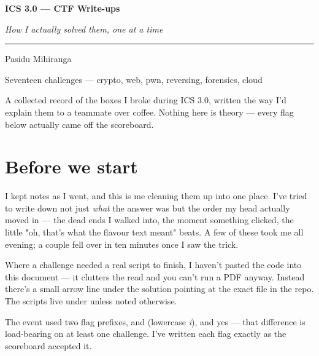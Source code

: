 \documentclass[11pt,a4paper]{article}
\newcommand{\code}[1]{\texttt{\detokenize{#1}}}
\begin{document}
\begin{titlepage}
\centering
\vspace*{3cm}
{\color{accent}\Huge\bfseries ICS 3.0 --- CTF Write-ups\par}
\vspace{0.6cm}
{\large\itshape How I actually solved them, one at a time\par}
\vspace{2cm}
\rule{0.5\linewidth}{0.6pt}\par
\vspace{1cm}
{\large Pasidu Mihiranga\par}
\vspace{0.3cm}
{\normalsize Seventeen challenges --- crypto, web, pwn, reversing, forensics, cloud\par}
\vfill
{\small A collected record of the boxes I broke during ICS 3.0, written the way
I'd explain them to a teammate over coffee. Nothing here is theory --- every
flag below actually came off the scoreboard.\par}
\vspace{2cm}
\end{titlepage}

\section*{Before we start}

I kept notes as I went, and this is me cleaning them up into one place. I've
tried to write down not just \emph{what} the answer was but the order my head
actually moved in --- the dead ends I walked into, the moment something clicked,
the little "oh, that's what the flavour text meant" beats. A few of these took
me all evening; a couple fell over in ten minutes once I saw the trick.

Where a challenge needed a real script to finish, I haven't pasted the code into
this document --- it clutters the read and you can't run a PDF anyway. Instead
there's a small arrow line under the solution pointing at the exact file in the
repo. The scripts live under \code{ALLWriteUps/scripts/} unless noted otherwise.

The event used two flag prefixes, \code{ICS{}} and \code{iCS{}} (lowercase
\emph{i}), and yes --- that difference is load-bearing on at least one
challenge. I've written each flag exactly as the scoreboard accepted it.
\end{document}
